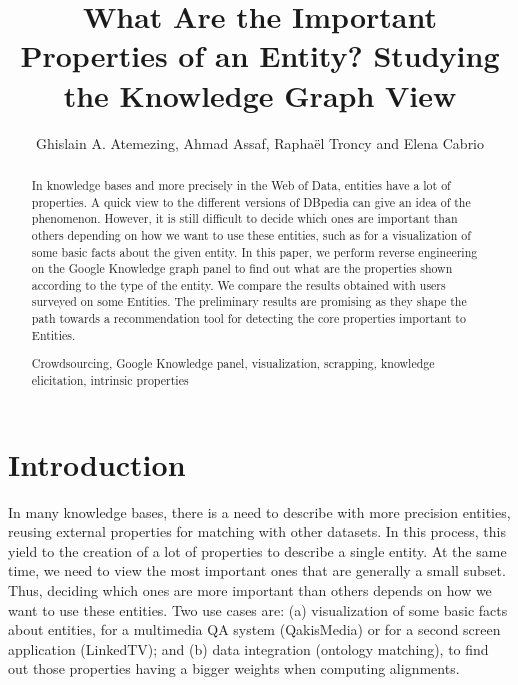 \documentclass[runningheads,a4paper]{llncs}
\newcommand{\keywords}[1]{\par\addvspace\baselineskip
\noindent\keywordname\enspace\ignorespaces#1}
\begin{document}
\title{What Are the Important Properties of an Entity? Studying the Knowledge Graph View}

\author{Ghislain A. Atemezing, Ahmad Assaf, Rapha\"{e}l Troncy and Elena Cabrio }



\maketitle


\begin{abstract}
In knowledge bases and more precisely in the Web of Data, entities have a lot of properties. A quick view to the different versions of DBpedia can give an idea of the phenomenon. However, it is still difficult to decide which ones are important than others depending on how we want to use these entities, such as for a visualization of some basic facts about the given entity. In this paper, we perform reverse engineering on the Google Knowledge graph panel to find out what are the properties shown according to the type of the entity. We compare the results obtained with users surveyed on some Entities. The preliminary results are promising as they shape the path towards a recommendation tool for detecting the core properties important to Entities.
\keywords{Crowdsourcing, Google Knowledge panel, visualization, scrapping, knowledge elicitation, intrinsic properties}
\end{abstract}


\section{Introduction}
\label{sec:introduction}
In many knowledge bases, there is a need to describe with more precision entities, reusing external properties for matching with other datasets. In this process, this yield to the creation of a lot of properties to describe a single entity. At the same time, we need to view the most important ones that are generally a small subset. Thus, deciding which ones are more important than others depends on how we want to use these entities. Two use cases are:
(a) visualization of some basic facts about entities, for a multimedia QA system (QakisMedia) or for a second screen application (LinkedTV); and (b) data integration (ontology matching), to find out those properties having a bigger weights when computing alignments.
\end{document}
